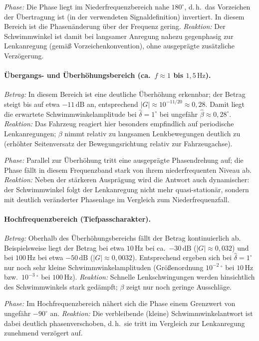 \emph{Phase:} Die Phase liegt im Niederfrequenzbereich nahe $180^\circ$, d.\,h.\ das Vorzeichen der Übertragung ist
(in der verwendeten Signaldefinition) invertiert. In diesem Bereich ist die Phasenänderung über der Frequenz gering.
\emph{Reaktion:} Der Schwimmwinkel ist damit bei langsamer Anregung nahezu gegenphasig zur Lenkanregung (gemäß
Vorzeichenkonvention), ohne ausgeprägte zusätzliche Verzögerung.

\paragraph{Übergangs- und Überhöhungsbereich (ca.\ $f\approx 1$ bis $1{,}5\,\mathrm{Hz}$).}
\emph{Betrag:} In diesem Bereich ist eine deutliche Überhöhung erkennbar; der Betrag steigt bis auf etwa
$-11\,\mathrm{dB}$ an, entsprechend $|G|\approx 10^{-11/20}\approx 0{,}28$.
Damit liegt die erwartete Schwimmwinkelamplitude bei $\hat{\delta}=1^\circ$ bei ungefähr
$\hat{\beta}\approx 0{,}28^\circ$.
\emph{Reaktion:} Das Fahrzeug reagiert hier besonders empfindlich auf periodische Lenkanregungen; $\beta$ nimmt
relativ zu langsamen Lenkbewegungen deutlich zu (erhöhter Seitenversatz der Bewegungsrichtung relativ zur Fahrzeugachse).

\emph{Phase:} Parallel zur Überhöhung tritt eine ausgeprägte Phasendrehung auf; die Phase fällt in diesem
Frequenzband stark von ihrem niederfrequenten Niveau ab.
\emph{Reaktion:} Neben der stärkeren Ausprägung wird die Antwort auch dynamischer: der Schwimmwinkel folgt der
Lenkanregung nicht mehr quasi-stationär, sondern mit deutlich veränderter Phasenlage im Vergleich zum Niederfrequenzfall.

\paragraph{Hochfrequenzbereich (Tiefpasscharakter).}
\emph{Betrag:} Oberhalb des Überhöhungsbereichs fällt der Betrag kontinuierlich ab. Beispielsweise liegt der Betrag
bei etwa $10\,\mathrm{Hz}$ bei ca.\ $-30\,\mathrm{dB}$ ($|G|\approx 0{,}032$) und bei $100\,\mathrm{Hz}$ bei etwa
$-50\,\mathrm{dB}$ ($|G|\approx 0{,}0032$). Entsprechend ergeben sich bei $\hat{\delta}=1^\circ$ nur noch sehr kleine
Schwimmwinkelamplituden (Größenordnung $10^{-2}\,^\circ$ bei $10\,\mathrm{Hz}$ bzw.\ $10^{-3}\,^\circ$ bei $100\,\mathrm{Hz}$).
\emph{Reaktion:} Schnelle Lenkschwingungen werden hinsichtlich des Schwimmwinkels stark gedämpft; $\beta$ zeigt nur
noch geringe Ausschläge.

\emph{Phase:} Im Hochfrequenzbereich nähert sich die Phase einem Grenzwert von ungefähr $-90^\circ$ an.
\emph{Reaktion:} Die verbleibende (kleine) Schwimmwinkelantwort ist dabei deutlich phasenverschoben, d.\,h.\ sie tritt
im Vergleich zur Lenkanregung zunehmend verzögert auf.